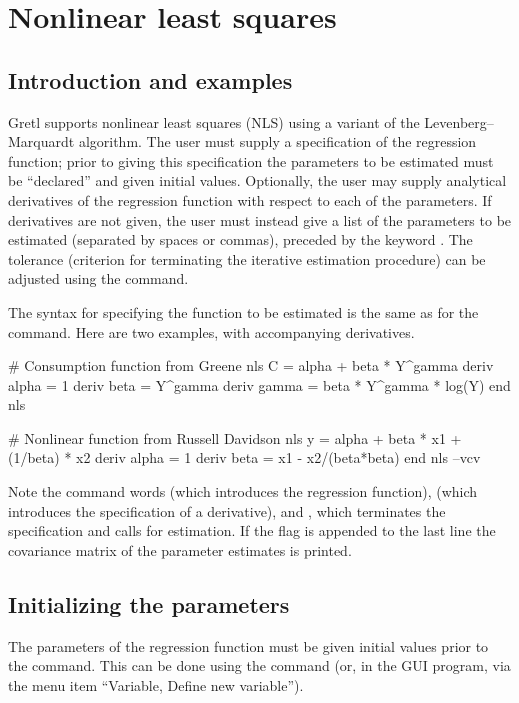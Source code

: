 \chapter{Nonlinear least squares}
\label{chap:nls}

\section{Introduction and examples}
\label{nls-intro}

Gretl supports nonlinear least squares (NLS) using a variant of
the Levenberg--Marquardt algorithm.  The user must supply a
specification of the regression function; prior to giving this
specification the parameters to be estimated must be ``declared'' and
given initial values.  Optionally, the user may supply analytical
derivatives of the regression function with respect to each of the
parameters.  If derivatives are not given, the user must instead give
a list of the parameters to be estimated (separated by spaces or
commas), preceded by the keyword .  The tolerance
(criterion for terminating the iterative estimation procedure) can be
adjusted using the  command.

The syntax for specifying the function to be estimated is the same as
for the  command.  Here are two examples, with accompanying
derivatives.

\begin{code}
# Consumption function from Greene
nls C = alpha + beta * Y^gamma
    deriv alpha = 1
    deriv beta = Y^gamma
    deriv gamma = beta * Y^gamma * log(Y)
end nls

# Nonlinear function from Russell Davidson
nls y = alpha + beta * x1 + (1/beta) * x2
    deriv alpha = 1
    deriv beta = x1 - x2/(beta*beta)
end nls --vcv
\end{code}

Note the command words  (which introduces the regression
function),  (which introduces the specification of a
derivative), and , which terminates the specification and
calls for estimation. If the  flag is appended to the last
line the covariance matrix of the parameter estimates is printed.

\section{Initializing the parameters}
\label{nls-param}

The parameters of the regression function must be given initial values
prior to the  command.  This can be done using the 
command (or, in the GUI program, via the menu item ``Variable, Define new
variable'').  

